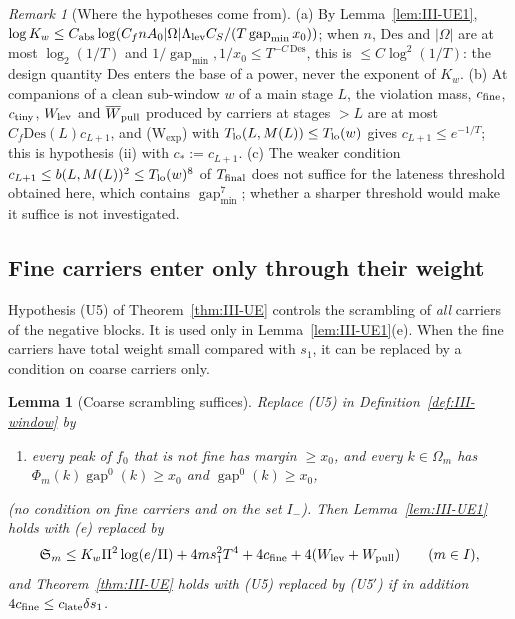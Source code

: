 \documentclass[10pt]{amsart}
\newtheorem{lemma}[theorem]{Lemma}
\theoremstyle{definition}
\theoremstyle{remark}
\newtheorem{remark}[theorem]{Remark}
\newcommand{\gap}{\operatorname{gap}}
\begin{document}
\begin{remark}[Where the hypotheses come from]\label{rem:III-S2c}
(a) By Lemma~\ref{lem:III-UE1}, $\log K_w\le C_{\rm abs}\log(C_fnA_0|\Omega|
\Lambda_{\rm lev}C_S/(T\gap_{\min}x_0))$; when $n$, $\mathrm{Des}$ and $|\Omega|$
are at most $\log_2(1/T)$ and $1/\gap_{\min},1/x_0\le T^{-C\,\mathrm{Des}}$, this is
$\le C\log^2(1/T)$: the design quantity $\mathrm{Des}$ enters the base of a power,
never the exponent of $K_w$.  (b) At companions of a clean sub-window $w$ of a
main stage $L$, the violation mass, $c_{\rm fine}$, $c_{\rm tiny}$, $W_{\rm lev}$
and $\overline W_{\rm pull}$ produced by carriers at stages $>L$ are at most
$C_f\mathrm{Des}(L)c_{L+1}$, and (W$_{\exp}$) with $T_{\rm lo}(L,M(L))\le
T_{\rm lo}(w)$ gives $c_{L+1}\le e^{-1/T}$; this is hypothesis (ii) with
$c_*:=c_{L+1}$.  (c) The weaker condition $c_{L+1}\le b(L,M(L))^2\le
T_{\rm lo}(w)^8$ of $T_{\rm final}$ does not suffice for the lateness threshold
obtained here, which contains $\gap_{\min}^7$; whether a sharper threshold would
make it suffice is not investigated.
\end{remark}

\subsection{Fine carriers enter only through their weight}\label{subsec:III-noB}

Hypothesis (U5) of Theorem~\ref{thm:III-UE} controls the scrambling of
\emph{all} carriers of the negative blocks.  It is used only in
Lemma~\ref{lem:III-UE1}(e).  When the fine carriers have total weight small
compared with $s_1$, it can be replaced by a condition on coarse carriers only.

\begin{lemma}[Coarse scrambling suffices]\label{lem:III-noB}
Replace \textup{(U5)} in Definition~\textup{\ref{def:III-window}} by
\begin{enumerate}
\item[(U5$'$)] every peak of $f_0$ that is not fine has margin $\ge x_0$, and every
$k\in\Omega_m$ has $\Phi_m(k)\gap^0(k)\ge x_0$ and $\gap^0(k)\ge x_0$,
\end{enumerate}
\textup{(}no condition on fine carriers and on the set $I_-$\textup{)}.  Then
Lemma~\textup{\ref{lem:III-UE1}} holds with \textup{(e)} replaced by
\[
 \mathfrak S_m\le K_w\Pi^2\log(e/\Pi)+4ms_1^2T^4+4c_{\rm fine}+4(W_{\rm lev}+
 W_{\rm pull})\qquad(m\in I),
\]
and Theorem~\textup{\ref{thm:III-UE}} holds with \textup{(U5)} replaced by
\textup{(U5$'$)} if in addition $4c_{\rm fine}\le c_{\rm late}\delta s_1$.
\end{lemma}
\end{document}
